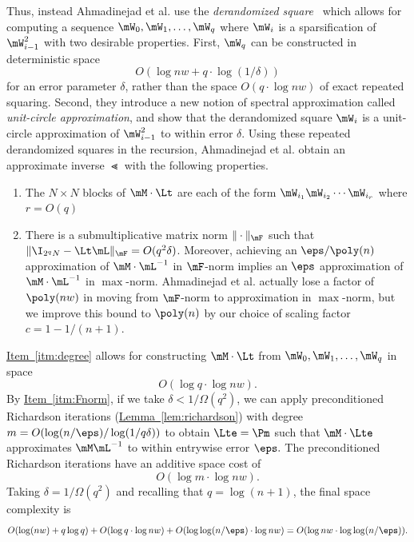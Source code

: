 \documentclass[11pt]{article}
\newcommand{\expref}[2]{\texorpdfstring{\hyperref[#2]{#1~\ref{#2}}}{#1~\ref{#2}}}
\begin{document}
    Thus, instead %
Ahmadinejad  %
et al. use the \emph{derandomized square}~\cite{RozenmanVa05} which allows for computing a sequence
    $\mW_0,\mW_1,\ldots,\mW_q$ where $\mW_i$ is a sparsification of $\mW^2_{i-1}$ with two desirable properties. First, $\mW_q$ can be constructed in
    deterministic space $$O(\log nw+q\cdot \log(1/\delta))$$ for an error parameter $\delta$, rather than the space $O(q\cdot \log nw)$ of exact repeated squaring.  Second, they introduce a new notion of spectral approximation called \emph{unit-circle approximation}, and show that
    the derandomized square
    $\mW_i$ is a unit-circle approximation of $\mW_{i-1}^2$ to within 
    error $\delta$.
    Using these repeated derandomized squares in the recursion, 
%
Ahmadinejad  %
et al. obtain an approximate inverse $\Lt$ with the
%
following properties.  %
    \begin{enumerate}
        \item The $N\times N$ blocks of $\mM\cdot \Lt$ are 
        each of the form $\mW_{i_1}\mW_{i_2}\cdots \mW_{i_r}$
        where $r=O(q)$ \label{itm:degree}
        \item There is a submultiplicative matrix norm $\|\cdot \|_\mF$ such that
        $\|\I_{2^qN}-\Lt \mL\|_\mF = O(q^2\delta)$. Moreover, achieving an $\eps/\poly(n)$ approximation of $\mM\cdot \mL^{-1}$ in $\mF$-norm implies an $\eps$ approximation of $\mM\cdot \mL^{-1}$ in $\max$-norm.   %
Ahmadinejad  %
et al. actually lose a factor of $\poly(nw)$ in moving from $\mF$-norm to approximation in $\max$-norm, but we improve this bound to $\poly(n)$ by our choice of scaling factor $c=1-1/(n+1)$.   
        \label{itm:Fnorm} 
    \end{enumerate}

    
    \expref{Item}{itm:degree} allows for constructing $\mM\cdot \Lt$ from
    $\mW_0,\mW_1,\ldots,\mW_q$
    in space
    $$O(\log q \cdot \log nw).$$
    By \expref{Item}{itm:Fnorm}, if we take $\delta<1/\Omega(q^2)$, we 
    can apply 
    preconditioned Richardson iterations (\expref{Lemma}{lem:richardson})
    with degree $m=O(\log(n/\eps)/\log(1/q\delta))$ to obtain $\Lte=\Pm$ 
    such that $\mM\cdot \Lte$ approximates $\mM\mL^{-1}$ to within entrywise error $\eps.$
    The preconditioned Richardson iterations have an additive
    space cost of %
    $$O(\log m\cdot \log nw).$$
    Taking $\delta=1/\Omega(q^2)$ and recalling that $q=\log(n+1)$, the final space complexity is
    $$O(\log(nw)+q\log q) + O(\log q\cdot \log nw)+O(\log\log (n/\eps)\cdot \log nw) = O(\log nw \cdot \log\log(n/\eps)).$$
    
\end{document}
